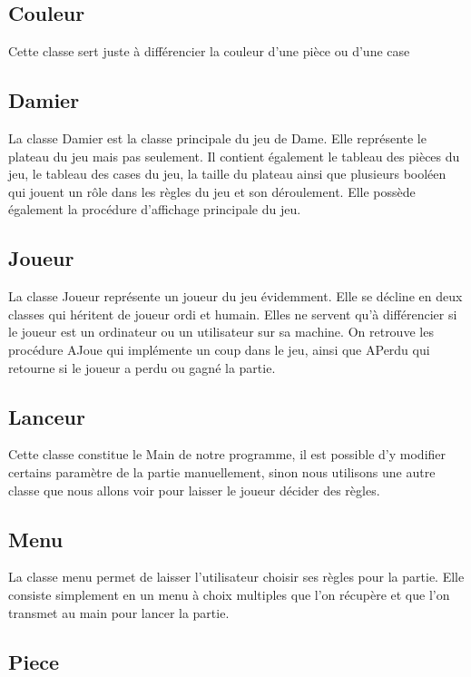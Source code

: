 \documentclass[12,french]{report}
\begin{document}
\subsection{Couleur}

Cette classe sert juste à différencier la couleur d'une pièce ou d'une case

\subsection{Damier}

La classe Damier est la classe principale du jeu de Dame. Elle représente le plateau du jeu mais pas seulement. Il contient également le tableau des pièces du jeu, le tableau des cases du jeu, la taille du plateau ainsi que plusieurs booléen qui jouent un rôle dans les règles du jeu et son déroulement. Elle possède également la procédure d'affichage principale du jeu.

\subsection{Joueur}

La classe Joueur représente un joueur du jeu évidemment. Elle se décline en deux classes qui héritent de joueur ordi et humain. Elles ne servent qu'à différencier si le joueur est un ordinateur ou un utilisateur sur sa machine. On retrouve les procédure AJoue qui implémente un coup dans le jeu, ainsi que APerdu qui retourne si le joueur a perdu ou gagné la partie.

\subsection{Lanceur}

Cette classe constitue le Main de notre programme, il est possible d'y modifier certains paramètre de la partie manuellement, sinon nous utilisons une autre classe que nous allons voir pour laisser le joueur décider des règles.

\subsection{Menu}

La classe menu permet de laisser l'utilisateur choisir ses règles pour la partie. Elle consiste simplement en un menu à choix multiples que l'on récupère et que l'on transmet au main pour lancer la partie.

\subsection{Piece}
\end{document}
